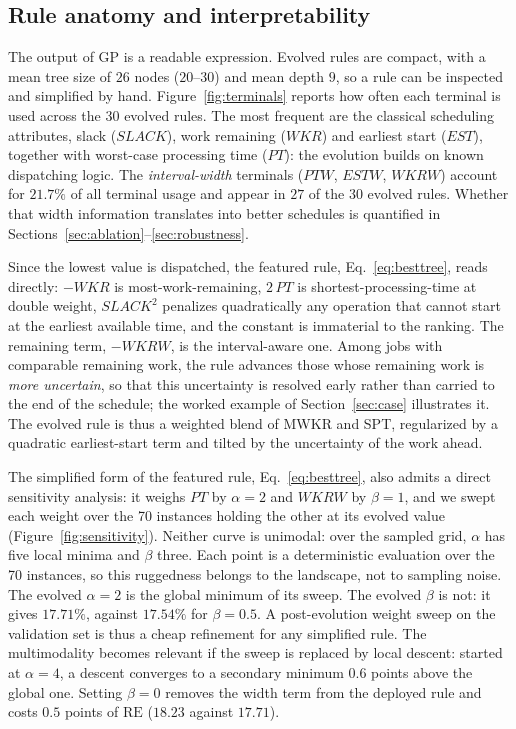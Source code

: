 \documentclass[review,authoryear,11pt]{elsarticle}
\newcommand{\RE}{\mathrm{RE}}
\begin{document}
\subsection{Rule anatomy and interpretability}
\label{sec:anatomy}
The output of GP is a readable expression. Evolved rules are compact,
with a mean tree size of $26$ nodes ($20$--$30$) and mean depth $9$, so
a rule can be inspected and simplified by hand.
Figure~\ref{fig:terminals} reports how often each terminal is used
across the 30 evolved rules. The most frequent are the classical
scheduling attributes, slack ($\mathit{SLACK}$), work remaining
($\mathit{WKR}$) and earliest start ($\mathit{EST}$), together with
worst-case processing time ($\mathit{PT}$): the evolution builds on
known dispatching logic. The \emph{interval-width} terminals ($\mathit{PTW}$,
$\mathit{ESTW}$, $\mathit{WKRW}$) account for $21.7\%$ of all
terminal usage and appear in $27$ of the $30$ evolved rules. Whether
that width information translates into better schedules is quantified in
Sections~\ref{sec:ablation}--\ref{sec:robustness}.

Since the lowest value is dispatched, the featured rule,
Eq.~\eqref{eq:besttree}, reads directly: $-\mathit{WKR}$ is most-work-remaining, $2\,
\mathit{PT}$ is shortest-processing-time at double weight, $\mathit{
SLACK}^{2}$ penalizes quadratically any operation that cannot start at
the earliest available time, and the constant is immaterial to the
ranking. The remaining term, $-\mathit{WKRW}$, is the interval-aware
one. Among jobs with comparable remaining work, the rule advances those
whose remaining work is \emph{more uncertain}, so that this uncertainty
is resolved early rather than carried to the end of the schedule; the
worked example of Section~\ref{sec:case} illustrates it.
The evolved rule is thus a weighted blend of MWKR and SPT, regularized
by a quadratic earliest-start term and tilted by the uncertainty of the
work ahead.

The simplified form of the featured rule, Eq.~\eqref{eq:besttree}, also
admits a direct sensitivity analysis: it weighs $\mathit{PT}$ by
$\alpha = 2$ and $\mathit{WKRW}$ by $\beta = 1$, and we swept each
weight over the 70 instances holding the other at its evolved value
(Figure~\ref{fig:sensitivity}). Neither curve is unimodal: over the
sampled grid, $\alpha$ has five local minima and $\beta$ three. Each
point is a deterministic evaluation over the 70 instances, so this
ruggedness belongs to the landscape, not to sampling noise. The evolved
$\alpha = 2$ is the global minimum of its sweep. The evolved $\beta$ is
not: it gives $17.71\%$, against $17.54\%$ for $\beta = 0.5$. A post-evolution weight sweep on the validation set is thus a cheap
refinement for any simplified rule. The multimodality becomes relevant if the sweep is replaced by local descent: started at $\alpha = 4$, a descent converges to a secondary minimum $0.6$ points above the global one. Setting
$\beta = 0$ removes the width term from the deployed rule and costs
$0.5$ points of $\RE$ ($18.23$ against $17.71$).
\end{document}
